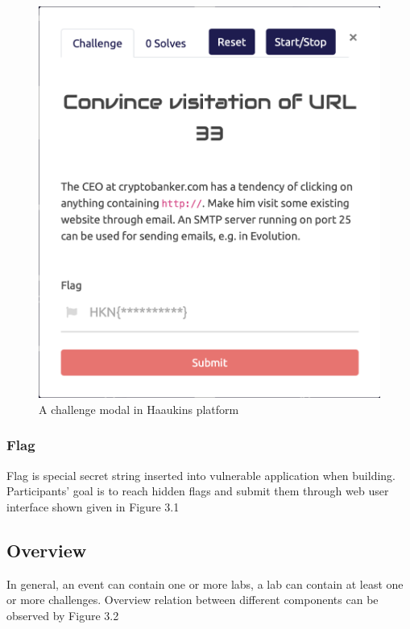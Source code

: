  
\begin{figure}[htbp]
\centerline{\includegraphics[scale=.4]{figures/flag-submission-modal.png}}
\caption{A challenge modal in Haaukins platform}
\label{fig}
\end{figure}
\newpage


\subsubsection{Flag}
 Flag is special secret string inserted into vulnerable application when building. Participants' goal is to reach hidden flags and submit them through web user interface shown given in Figure 3.1


\subsection{Overview}
 In general, an event can contain one or more labs, a lab can contain at least one or more challenges. Overview relation between different components can be observed by Figure 3.2
 
